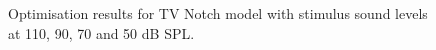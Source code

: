 \begin{figure}[htb]
  \centering
  \caption[TV cell model: optimisation results]{Optimisation results for TV Notch model with stimulus sound levels at 110, 90, 70 and 50 dB SPL.}
  \label{fig:TV_result_spl}
\end{figure}





